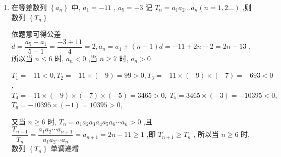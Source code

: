 \begin{enumerate}
\begin{jieda}
        又由 $\dfrac{10}{{n}^{2}} + \dfrac{1}{n} + \lambda {a}_{n} \geq  0$ 恒成立,即 $\lambda  \geq   - \left( {\dfrac{10}{{n}^{2}} + \dfrac{1}{n}}\right) \left( {{n}^{2} + n}\right)$ ,对 $\forall n \in  {\mathrm{N}}^{ * }$ 恒成立,
        令 $f\left( n\right)  =  - \left( {\dfrac{10}{{n}^{2}} + \dfrac{1}{n}}\right) \left( {{n}^{2} + n}\right)  =  - \left( {{11} + \dfrac{10}{n} + n}\right)  \leq   - \left( {{11} + 2\sqrt{10}}\right)$ ,
        当且仅当 $n = \dfrac{10}{n}$ ,即 $n = \sqrt{10}$ 时等号成立.
        
        又 $n \in  {\mathrm{N}}^{ * }$ ,
        当 $n = 3$ 时, $f\left( 3\right)  =  - \dfrac{52}{3}$ ,当 $n = 4$ 时, $f\left( 4\right)  =  - \dfrac{35}{2}$ ,
        由对勾函数 $y =  - \left( {\dfrac{10}{n} + n}\right)$ 的单调性,得 $f\left( n\right)  \leq   - \dfrac{52}{3}$ ,所以 $\lambda  \geq   - \dfrac{52}{3}$ .
        所以实数 $\lambda$ 的取值范围是 $\left\lbrack  {-\dfrac{52}{3}, + \infty }\right)$
    \end{jieda} 
    
    \item 在等差数列 $\left\{  {a}_{n}\right\}$ 中, ${a}_{1} =  - {11}$ , ${a}_{5} =  - 3$ 记 ${T}_{n} = {a}_{1}{a}_{2}\ldots {a}_{n}\left( {n = 1,2\ldots }\right)$ ,则数列 $\left\{  {T}_{n}\right\}$
    \begin{jieda}
        依题意可得公差 $d = \dfrac{{a}_{5} - {a}_{1}}{5 - 1} = \dfrac{-3 + {11}}{4} = 2,{a}_{n} = {a}_{1} + \left( {n - 1}\right) d =  - {11} + {2n} - 2 = {2n} - {13}$ ,
        所以当 $n \leq  6$ 时, ${a}_{n} < 0$ ,当 $n \geq  7$ 时, ${a}_{n} > 0$ 
        
        ${T}_{1} =  - {11} < 0,{T}_{2} =  - {11} \times  \left( {-9}\right)  = {99} > 0,{T}_{3} =  - {11} \times  \left( {-9}\right)  \times  \left( {-7}\right)  =  - {693} < 0$ ,
        ${T}_{4} =  - {11} \times  \left( {-9}\right)  \times  \left( {-7}\right)  \times  \left( {-5}\right)  = {3465} > 0,\;{T}_{5} = {3465} \times  \left( {-3}\right)  =  - {10395} < 0,$
        ${T}_{6} =  - {10395} \times  \left( {-1}\right)  = {10395} > 0,$
        
        又当 $n \geq  6$ 时, ${T}_{n} = {a}_{1}{a}_{2}{a}_{3}{a}_{4}{a}_{5}{a}_{6}\cdots {a}_{n} > 0$ ,且 $\dfrac{{T}_{n + 1}}{{T}_{n}} = \dfrac{{a}_{1}{a}_{2}\cdots {a}_{n + 1}}{{a}_{1}{a}_{2}\cdots {a}_{n}} = {a}_{n + 1} = {2n} - {11} \geq  1$ ,即 ${T}_{n + 1} \geq  {T}_{n}$ ,
        所以当 $n \geq  6$ 时,数列 $\left\{  {T}_{n}\right\}$ 单调递增
        

\end{jieda}
\end{enumerate}
